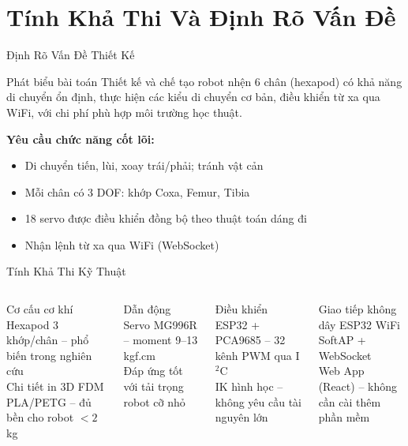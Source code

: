 \section{Tính Khả Thi Và Định Rõ Vấn Đề}

\begin{frame}{Định Rõ Vấn Đề Thiết Kế}
  \begin{block}{Phát biểu bài toán}
    Thiết kế và chế tạo robot nhện 6 chân (hexapod) có khả năng di chuyển ổn định,
    thực hiện các kiểu di chuyển cơ bản, điều khiển từ xa qua WiFi,
    với chi phí phù hợp môi trường học thuật.
  \end{block}
  \vspace{0.3cm}
  \textbf{Yêu cầu chức năng cốt lõi:}
  \begin{itemize}
    \item Di chuyển tiến, lùi, xoay trái/phải; tránh vật cản
    \item Mỗi chân có 3 DOF: khớp Coxa, Femur, Tibia
    \item 18 servo được điều khiển đồng bộ theo thuật toán dáng đi
    \item Nhận lệnh từ xa qua WiFi (WebSocket)
  \end{itemize}
\end{frame}

\begin{frame}{Tính Khả Thi Kỹ Thuật}
  \begin{columns}[T]
      \begin{exampleblock}{Cơ cấu cơ khí}
        Hexapod 3 khớp/chân -- phổ biến trong nghiên cứu\\
        Chi tiết in 3D FDM PLA/PETG -- đủ bền cho robot $< 2$ kg
      \end{exampleblock}
      \vspace{0.2cm}
      \begin{exampleblock}{Dẫn động}
        Servo MG996R -- moment 9--13 kgf.cm\\
        Đáp ứng tốt với tải trọng robot cỡ nhỏ
      \end{exampleblock}
      \begin{exampleblock}{Điều khiển}
        ESP32 + PCA9685 -- 32 kênh PWM qua I$^2$C\\
        IK hình học -- không yêu cầu tài nguyên lớn
      \end{exampleblock}
      \vspace{0.2cm}
      \begin{exampleblock}{Giao tiếp không dây}
        ESP32 WiFi SoftAP + WebSocket\\
        Web App (React) -- không cần cài thêm phần mềm
      \end{exampleblock}
  \end{columns}
\end{frame}


